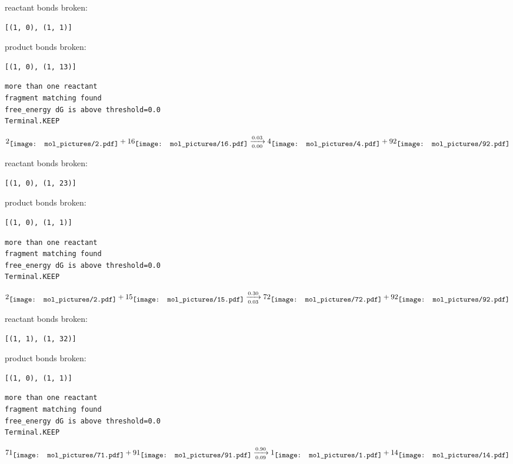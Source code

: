 \documentclass{article}
\begin{document}
reactant bonds broken:\begin{verbatim}
[(1, 0), (1, 1)]
\end{verbatim}
product bonds broken:\begin{verbatim}
[(1, 0), (1, 13)]
\end{verbatim}




\vspace{1cm}
\begin{verbatim}
more than one reactant
fragment matching found
free_energy dG is above threshold=0.0
Terminal.KEEP
\end{verbatim}
$$
2
\raisebox{-.5\height}{\texttt{[image: mol\_pictures/2.pdf]}}
+
16
\raisebox{-.5\height}{\texttt{[image: mol\_pictures/16.pdf]}}
\xrightarrow[0.00]{0.03}
4
\raisebox{-.5\height}{\texttt{[image: mol\_pictures/4.pdf]}}
+
92
\raisebox{-.5\height}{\texttt{[image: mol\_pictures/92.pdf]}}
$$


reactant bonds broken:\begin{verbatim}
[(1, 0), (1, 23)]
\end{verbatim}
product bonds broken:\begin{verbatim}
[(1, 0), (1, 1)]
\end{verbatim}




\vspace{1cm}
\begin{verbatim}
more than one reactant
fragment matching found
free_energy dG is above threshold=0.0
Terminal.KEEP
\end{verbatim}
$$
2
\raisebox{-.5\height}{\texttt{[image: mol\_pictures/2.pdf]}}
+
15
\raisebox{-.5\height}{\texttt{[image: mol\_pictures/15.pdf]}}
\xrightarrow[0.03]{0.30}
72
\raisebox{-.5\height}{\texttt{[image: mol\_pictures/72.pdf]}}
+
92
\raisebox{-.5\height}{\texttt{[image: mol\_pictures/92.pdf]}}
$$


reactant bonds broken:\begin{verbatim}
[(1, 1), (1, 32)]
\end{verbatim}
product bonds broken:\begin{verbatim}
[(1, 0), (1, 1)]
\end{verbatim}




\vspace{1cm}
\begin{verbatim}
more than one reactant
fragment matching found
free_energy dG is above threshold=0.0
Terminal.KEEP
\end{verbatim}
$$
71
\raisebox{-.5\height}{\texttt{[image: mol\_pictures/71.pdf]}}
+
91
\raisebox{-.5\height}{\texttt{[image: mol\_pictures/91.pdf]}}
\xrightarrow[0.09]{0.90}
1
\raisebox{-.5\height}{\texttt{[image: mol\_pictures/1.pdf]}}
+
14
\raisebox{-.5\height}{\texttt{[image: mol\_pictures/14.pdf]}}
$$
\end{document}
